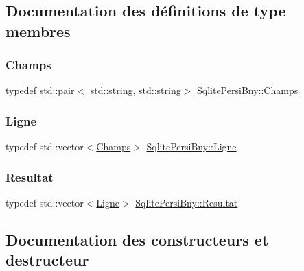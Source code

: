 \subsection{Documentation des définitions de type membres}
\mbox{\label{classSqlitePersiBny_af3de7ea7bd4146b4ce0a00ceae01befd}} 
\subsubsection{\texorpdfstring{Champs}{Champs}}
{\footnotesize\ttfamily typedef std\+::pair$<$ std\+::string, std\+::string$>$ \hyperlink{classSqlitePersiBny_af3de7ea7bd4146b4ce0a00ceae01befd}{Sqlite\+Persi\+Bny\+::\+Champs}}

\mbox{\label{classSqlitePersiBny_a32400b54d9a08cae7d60d985a5d48892}} 
\subsubsection{\texorpdfstring{Ligne}{Ligne}}
{\footnotesize\ttfamily typedef std\+::vector$<$\hyperlink{classSqlitePersiBny_af3de7ea7bd4146b4ce0a00ceae01befd}{Champs}$>$ \hyperlink{classSqlitePersiBny_a32400b54d9a08cae7d60d985a5d48892}{Sqlite\+Persi\+Bny\+::\+Ligne}}

\mbox{\label{classSqlitePersiBny_a04bdd1bacd9241210ea44ec2c072f79b}} 
\subsubsection{\texorpdfstring{Resultat}{Resultat}}
{\footnotesize\ttfamily typedef std\+::vector$<$\hyperlink{classSqlitePersiBny_a32400b54d9a08cae7d60d985a5d48892}{Ligne}$>$ \hyperlink{classSqlitePersiBny_a04bdd1bacd9241210ea44ec2c072f79b}{Sqlite\+Persi\+Bny\+::\+Resultat}}



\subsection{Documentation des constructeurs et destructeur}
\mbox{\label{classSqlitePersiBny_af4ff22e110cfc9ad07460e2aedb9d884}} 
